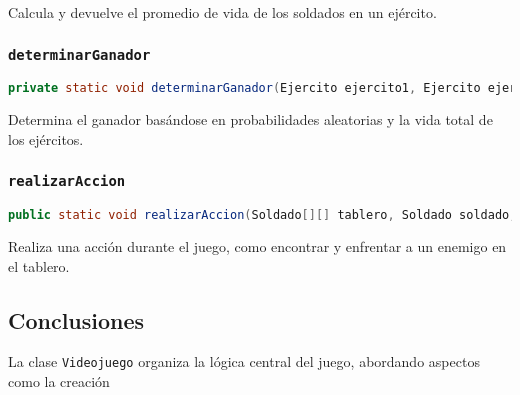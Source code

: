 Calcula y devuelve el promedio de vida de los soldados en un ejército.

\subsubsection{\texttt{determinarGanador}}
\begin{lstlisting}[language=Java]
private static void determinarGanador(Ejercito ejercito1, Ejercito ejercito2, String reinoJugador1, String reinoJugador2)
\end{lstlisting}

Determina el ganador basándose en probabilidades aleatorias y la vida total de los ejércitos.

\subsubsection{\texttt{realizarAccion}}
\begin{lstlisting}[language=Java]
public static void realizarAccion(Soldado[][] tablero, Soldado soldado, ArrayList<Soldado> ejercito, ArrayList<Soldado> ejercitoE, Scanner sc)
\end{lstlisting}

Realiza una acción durante el juego, como encontrar y enfrentar a un enemigo en el tablero.

\subsection{Conclusiones}

La clase \texttt{Videojuego} organiza la lógica central del juego, abordando aspectos como la creación
